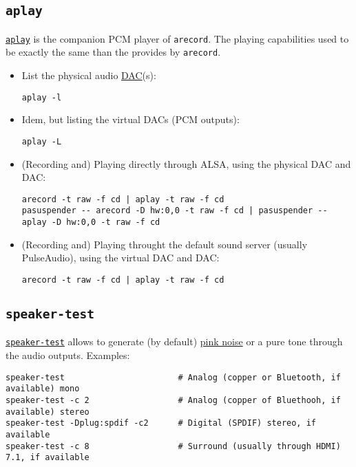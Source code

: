 \subsection{\texttt{aplay}}
\texttt{\href{https://linux.die.net/man/1/aplay}{aplay}} is the
companion PCM player of \texttt{arecord}. The playing capabilities
used to be exactly the same than the provides by \texttt{arecord}.

\begin{itemize}

\item List the physical audio \href{https://en.wikipedia.org/wiki/Digital-to-analog_converter}{DAC}(s):
\begin{verbatim}
aplay -l      
\end{verbatim}

\item Idem, but listing the virtual DACs (PCM outputs):
\begin{verbatim}
aplay -L
\end{verbatim}

\item (Recording and) Playing directly through ALSA, using the physical DAC and DAC:
\begin{verbatim}
arecord -t raw -f cd | aplay -t raw -f cd
pasuspender -- arecord -D hw:0,0 -t raw -f cd | pasuspender -- aplay -D hw:0,0 -t raw -f cd
\end{verbatim}

\item (Recording and) Playing throught the default sound server (usually PulseAudio), using the virtual DAC and DAC:
\begin{verbatim}
arecord -t raw -f cd | aplay -t raw -f cd
\end{verbatim}
\end{itemize}

\subsection{\texttt{speaker-test}}
\texttt{\href{https://linux.die.net/man/1/speaker-test}{speaker-test}} allows to generate (by default) \href{https://en.wikipedia.org/wiki/Pink_noise}{pink noise} or a pure tone through the audio outputs. Examples:
\begin{verbatim}
speaker-test                       # Analog (copper or Bluetooth, if available) mono
speaker-test -c 2                  # Analog (copper of Bluethooh, if available) stereo
speaker-test -Dplug:spdif -c2      # Digital (SPDIF) stereo, if available
speaker-test -c 8                  # Surround (usually through HDMI) 7.1, if available
\end{verbatim}

